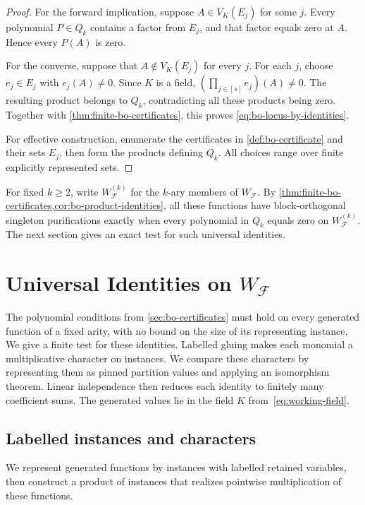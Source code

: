\documentclass[11pt,letterpaper,onecolumn]{article}
\theoremstyle{plain}
\theoremstyle{definition}
\theoremstyle{remark}
\newcommand{\cF}{\mathcal F}
\begin{document}
\begin{proof}
For the forward implication, suppose $A\in V_K(E_j)$ for some $j$.
Every polynomial $P\in Q_k$ contains a
factor from $E_j$, and that factor equals zero at $A$.  Hence every $P(A)$ is
zero.

For the converse, suppose that $A\notin V_K(E_j)$ for every $j$.  For each $j$,
choose $e_j\in E_j$ with $e_j(A)\ne0$.  Since $K$ is a field, $\left(\prod_{j\in[s]} e_j\right)(A)\ne0$. The resulting product belongs to $Q_k$, contradicting all these products being zero.
Together with \cref{thm:finite-bo-certificates}, this proves
\eqref{eq:bo-locus-by-identities}.

For effective construction, enumerate the certificates in
\cref{def:bo-certificate} and their sets $E_j$, then form the products
defining $Q_k$.  All choices range over finite explicitly represented sets.
\end{proof}

For fixed $k\ge2$, write $W_{\cF}^{(k)}$ for the $k$-ary members of $W_{\cF}$.
By \cref{thm:finite-bo-certificates,cor:bo-product-identities}, all these
functions have block-orthogonal singleton purifications exactly when every
polynomial in $Q_k$ equals zero on $W_{\cF}^{(k)}$.  The next section gives
an exact test for such universal identities.

\section{Universal Identities on \texorpdfstring{$W_{\cF}$}{W(F)}}
\label{sec:universal-identities}

The polynomial conditions from \cref{sec:bo-certificates} must hold on
every generated function of a fixed arity, with no bound on the size of
its representing instance.  We give a finite test for these identities.
Labelled gluing makes each monomial a
multiplicative character on instances.  We compare these characters by
representing them as pinned partition values and applying an isomorphism
theorem.  Linear independence then reduces each identity to finitely many
coefficient sums.  The generated values lie in the field $K$
from~\eqref{eq:working-field}.

\subsection{Labelled instances and characters}
\label{subsec:labelled-instances}

We represent generated functions by instances with labelled retained
variables, then construct a product of instances that realizes pointwise
multiplication of these functions.
\end{document}
